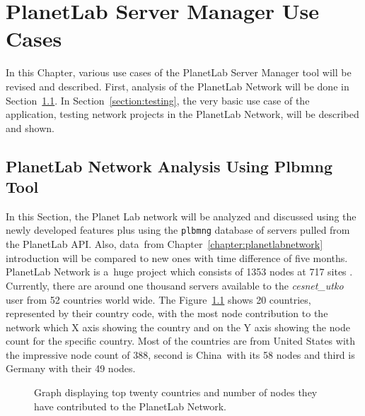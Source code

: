 {{{{{{{\chapter{PlanetLab Server Manager Use Cases}
\label{chapter:usecase}
In this Chapter, various use cases of the PlanetLab Server Manager tool will be revised and described. First, analysis of the PlanetLab Network will be done in Section~\ref{section:analysis}. In Section~\ref{section:testing}, the very basic use case of the application, testing network projects in the PlanetLab Network, will be described and shown.

\section{PlanetLab Network Analysis Using Plbmng Tool}
\label{section:analysis}
In this Section, the Planet Lab network will be analyzed and discussed using the newly developed features plus using the \texttt{plbmng} database of servers pulled from the PlanetLab API. Also, data~from Chapter~\ref{chapter:planetlabnetwork} introduction will be compared to new ones with time difference of five months.\\
PlanetLab Network is a~huge project which consists of 1353 nodes at 717 sites \cite{planetlabmain}. Currently, there are around one thousand servers available to the \textit{cesnet\_utko} user from 52 countries world wide. The Figure~\ref{fig:allcountriesgraph} shows 20 countries, represented by their country code, with the most node contribution to the network which X axis showing the country and on the Y axis showing the node count for the specific country. Most of the countries are from United States with the impressive node count of 388, second is China~with its 58 nodes and third is Germany with their 49 nodes. 

\begin{figure}[H]
	\centering
	\caption{Graph displaying top twenty countries and number of nodes they have contributed to the PlanetLab Network.}
	\label{fig:allcountriesgraph}
\end{figure}

}}}}}}}
